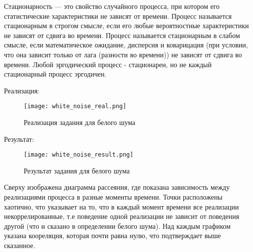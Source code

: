 Стационарность — это свойство случайного процесса, при котором его статистические характеристики не зависят от времени.
Процесс называется стационарным в строгом смысле, если его любые вероятностные характеристики не зависят от сдвига во времени.
Процесс называется стационарным в слабом смысле, если математическое ожидание, дисперсия и коварицация (при условии, что она зависит
только от лага (разности во времени)) не зависят от сдвига во времени. Любой эргодический процесс - стационарен, но не каждый
стационарный процесс эргодичен.

Реализация:\\

\begin{figure}[H]
    \centering
    \texttt{[image: white\_noise\_real.png]}
    \caption{Реализация задания для белого шума}
\end{figure}

Результат:\\

\begin{figure}[H]
    \centering
    \texttt{[image: white\_noise\_result.png]}
    \caption{Результат задания для белого шума}
\end{figure}

Сверху изображена диаграмма рассеяния, где показана зависимость между реализациями процесса в разные моменты времени. Точки расположены
хаотично, что указывает на то, что в каждый момент времени все реализации некоррелированные, т.е поведение одной реализации
не зависит от поведения другой (что и сказано в определении белого шума). Над каждым графиком указана коореляция, которая почти равна нулю,
что подтверждает выше сказанное.

\endinput